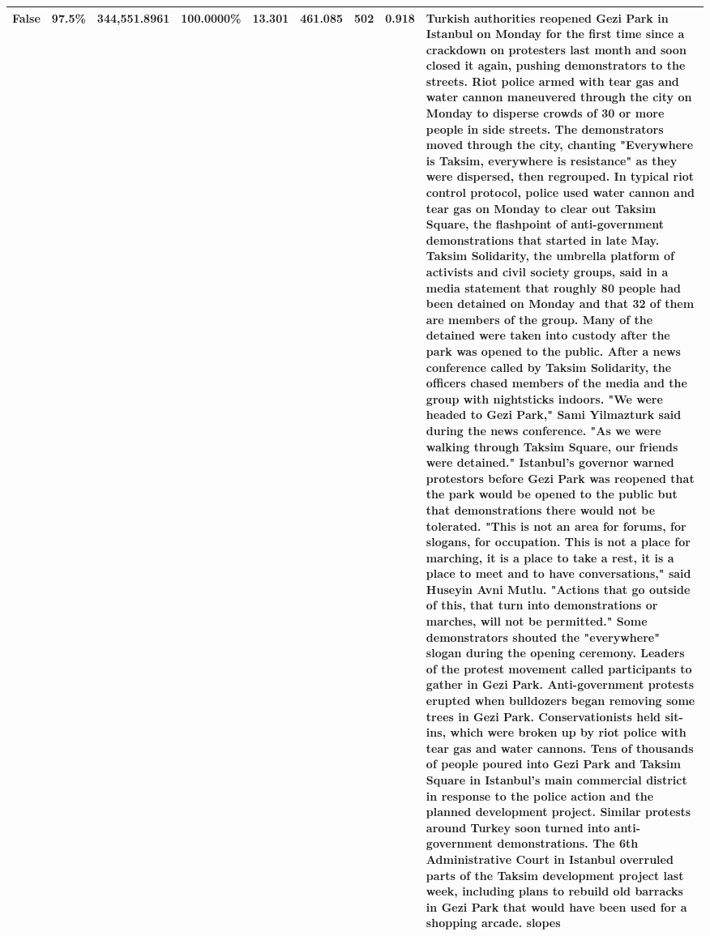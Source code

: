 \begin{table}[H]
\begin{tabular}{lllrlllll}
\cline{1-9}
False & 97.5\% & 344,551.8961 & \bfseries \color{red} 100.0000\% & 13.301 & 461.085 & 502 & 0.918 & Turkish authorities reopened Gezi Park in Istanbul on Monday for the first time since a crackdown on protesters last month and soon closed it again, pushing demonstrators to the streets. Riot police armed with tear gas and water cannon maneuvered through the city on Monday to disperse crowds of 30 or more people in side streets. The demonstrators moved through the city, chanting "Everywhere is Taksim, everywhere is resistance" as they were dispersed, then regrouped. In typical riot control protocol, police used water cannon and tear gas on Monday to clear out Taksim Square, the flashpoint of anti-government demonstrations that started in late May. Taksim Solidarity, the umbrella platform of activists and civil society groups, said in a media statement that roughly 80 people had been detained on Monday and that 32 of them are members of the group. Many of the detained were taken into custody after the park was opened to the public. After a news conference called by Taksim Solidarity, the officers chased members of the media and the group with nightsticks indoors. "We were headed to Gezi Park," Sami Yilmazturk said during the news conference. "As we were walking through Taksim Square, our friends were detained." Istanbul's governor warned protestors before Gezi Park was reopened that the park would be opened to the public but that demonstrations there would not be tolerated. "This is not an area for forums, for slogans, for occupation. This is not a place for marching, it is a place to take a rest, it is a place to meet and to have conversations," said Huseyin Avni Mutlu. "Actions that go outside of this, that turn into demonstrations or marches, will not be permitted." Some demonstrators shouted the "everywhere" slogan during the opening ceremony. Leaders of the protest movement called participants to gather in Gezi Park. Anti-government protests erupted when bulldozers began removing some trees in Gezi Park. Conservationists held sit-ins, which were broken up by riot police with tear gas and water cannons. Tens of thousands of people poured into Gezi Park and Taksim Square in Istanbul's main commercial district in response to the police action and the planned development project. Similar protests around Turkey soon turned into anti-government demonstrations. The 6th Administrative Court in Istanbul overruled parts of the Taksim development project last week, including plans to rebuild old barracks in Gezi Park that would have been used for a shopping arcade. slopes \\
\cline{1-9}
\bottomrule
\end{tabular}
\end{table}
